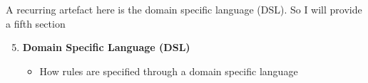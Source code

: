 {\begin{multicols}{2}
		\end{multicols}
		\vspace{-1mm}
		
		A recurring artefact here is the domain specific language (DSL). So I will provide a fifth section
		
		\begin{enumerate}
			\setcounter{enumi}{4}
			\item \textbf{Domain Specific Language (DSL)} 
				\vspace{-2mm}
				\begin{itemize}
					\item How rules are specified through a domain specific language
				\end{itemize}			
		\end{enumerate}		
	}		
